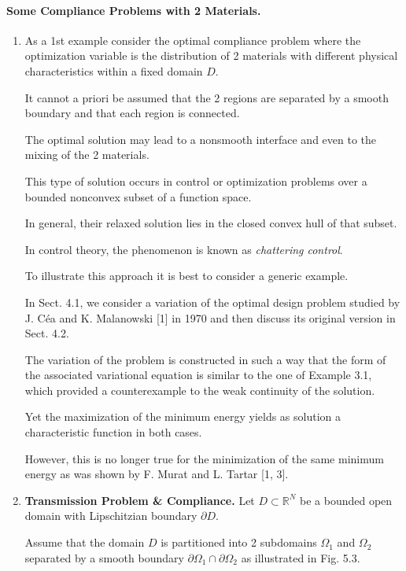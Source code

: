 \documentclass{book}
\numberwithin{equation}{section}
\begin{document}
\paragraph{Some Compliance Problems with 2 Materials.}
\begin{enumerate}
    \item As a 1st example consider the optimal compliance problem where the optimization variable is the distribution of 2 materials with different physical characteristics within a fixed domain $D$.
    
    It cannot a priori be assumed that the 2 regions are separated by a smooth boundary and that each region is connected.
    
    The optimal solution may lead to a nonsmooth interface and even to the mixing of the 2 materials.
    
    This type of solution occurs in control or optimization problems over a bounded nonconvex subset of a function space.
    
    In general, their relaxed solution lies in the closed convex hull of that subset.
    
    In control theory, the phenomenon is known as \textit{chattering control}.
    
    To illustrate this approach it is best to consider a generic example.
    
    In Sect. 4.1, we consider a variation of the optimal design problem studied by J. Céa and K. Malanowski [1] in 1970 and then discuss its original version in Sect. 4.2.
    
    The variation of the problem is constructed in such a way that the form of the associated variational equation is similar to the one of Example 3.1, which provided a counterexample to the weak continuity of the solution.
    
    Yet the maximization of the minimum energy yields as solution a characteristic function in both cases.
    
    However, this is no longer true for the minimization of the same minimum energy as was shown by F. Murat and L. Tartar [1, 3].
    \item \textbf{Transmission Problem \& Compliance.} Let $D\subset\mathbb{R}^N$ be a bounded open domain with Lipschitzian boundary $\partial D$.
    
    Assume that the domain $D$ is partitioned into 2 subdomains $\Omega_1$ and $\Omega_2$ separated by a smooth boundary $\partial\Omega_1\cap\partial\Omega_2$ as illustrated in Fig. 5.3.
    

\end{enumerate}
\end{document}
